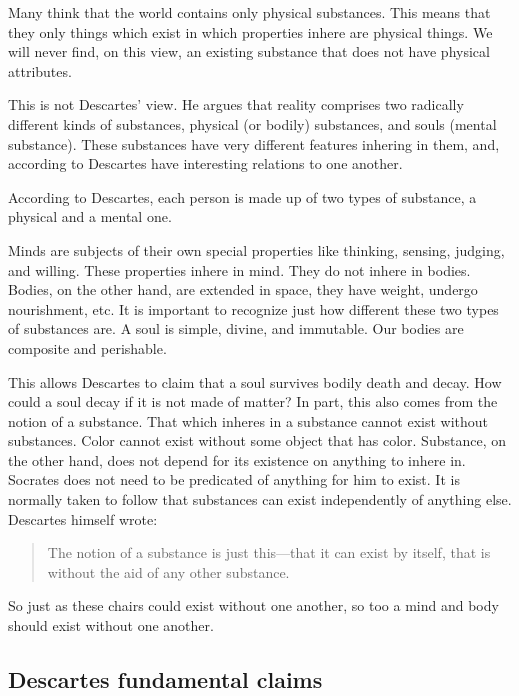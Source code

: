 \documentclass[]{article}
\begin{document}
Many think that the world contains only physical substances. This means
that they only things which exist in which properties inhere are
physical things. We will never find, on this view, an existing substance
that does not have physical attributes.

This is not Descartes' view. He argues that reality comprises two
radically different kinds of substances, physical (or bodily)
substances, and souls (mental substance). These substances have very
different features inhering in them, and, according to Descartes have
interesting relations to one another.

According to Descartes, each person is made up of two types of
substance, a physical and a mental one.

Minds are subjects of their own special properties like thinking,
sensing, judging, and willing. These properties inhere in mind. They do
not inhere in bodies. Bodies, on the other hand, are extended in space,
they have weight, undergo nourishment, etc. It is important to recognize
just how different these two types of substances are. A soul is simple,
divine, and immutable. Our bodies are composite and perishable.

This allows Descartes to claim that a soul survives bodily death and
decay. How could a soul decay if it is not made of matter? In part, this
also comes from the notion of a substance. That which inheres in a
substance cannot exist without substances. Color cannot exist without
some object that has color. Substance, on the other hand, does not
depend for its existence on anything to inhere in. Socrates does not
need to be predicated of anything for him to exist. It is normally taken
to follow that substances can exist independently of anything else.
Descartes himself wrote:

\begin{quote}
The notion of a substance is just this---that it can exist by itself,
that is without the aid of any other substance.
\end{quote}

So just as these chairs could exist without one another, so too a mind
and body should exist without one another.

\subsection{Descartes fundamental
claims}\label{descartes-fundamental-claims}
\end{document}

